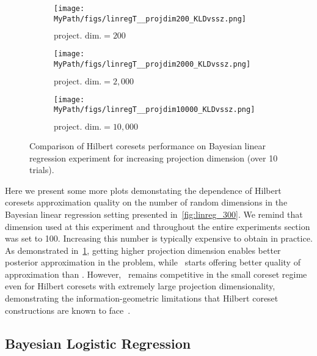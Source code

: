 \begin{figure}[t]
	\centering
	\begin{subfigure}[b]{.29\textwidth}
		\centerline{\texttt{[image: \\MyPath/figs/linregT\_\_projdim200\_KLDvssz.png]}}%
			\caption{$\text{project. dim.}=200$}
	\end{subfigure}\hfill\qquad
	\centering
	\begin{subfigure}[b]{.29\textwidth}
		\centerline{\texttt{[image: \\MyPath/figs/linregT\_\_projdim2000\_KLDvssz.png]}}%
			\caption{$\text{project. dim.}=2,000$}
	\end{subfigure}\hfill\qquad
	\centering
	\begin{subfigure}[b]{.29\textwidth}
		\centerline{\texttt{[image: \\MyPath/figs/linregT\_\_projdim10000\_KLDvssz.png]}}%
			\caption{$\text{project. dim.}=10,000$}
	\end{subfigure}
	\caption{Comparison of Hilbert coresets performance on Bayesian linear regression experiment for increasing projection dimension (over 10 trials).}
	\label{fig:hilbert_varying_projdim}
\end{figure}

Here we present some more plots demonstating the dependence of Hilbert coresets approximation quality on the number of random dimensions in the Bayesian linear regression setting presented in~\cref{fig:linreg_300}. We remind that dimension used at this experiment and throughout the entire experiments section was set to 100. Increasing this number is typically expensive to obtain in practice. As demonstrated in~\cref{fig:hilbert_varying_projdim}, getting higher projection dimension enables better posterior approximation in the problem, while \gigao~starts offering better quality of approximation than \gigar. However, \psvi~remains competitive in the small coreset regime even for Hilbert coresets with extremely large projection dimensionality, demonstrating the information-geometric limitations that Hilbert coreset constructions are known to face~\cite{campbell19neurips}.



\subsection{Bayesian Logistic Regression}
\label{supp:logreg_experiment_appendix}
 


